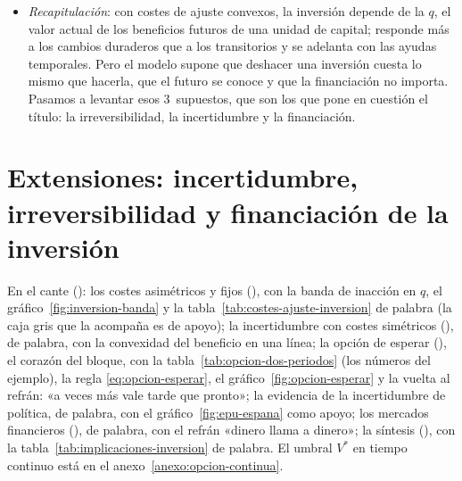 \documentclass[11pt]{article}
\begin{document}
\begin{itemize}
\item \emph{Recapitulación}: con costes de ajuste convexos, la inversión depende de la $q$, el valor actual de los beneficios futuros de una unidad de capital; responde más a los cambios duraderos que a los transitorios y se adelanta con las ayudas temporales. Pero el modelo supone que deshacer una inversión cuesta lo mismo que hacerla, que el futuro se conoce y que la financiación no importa. Pasamos a levantar esos 3~supuestos, que son los que pone en cuestión el título: la irreversibilidad, la incertidumbre y la financiación.
\end{itemize}


\section{Extensiones: incertidumbre, irreversibilidad\cortetitulo{} y financiación de la inversión}\label{sec:extensiones}

\begin{notaopositor}
En el cante (): los costes asimétricos y fijos (), con la banda de inacción en $q$, el gráfico~\ref{fig:inversion-banda} y la tabla~\ref{tab:costes-ajuste-inversion} de palabra (la caja gris que la acompaña es de apoyo); la incertidumbre con costes simétricos (), de palabra, con la convexidad del beneficio en una línea; la opción de esperar (), el corazón del bloque, con la tabla~\ref{tab:opcion-dos-periodos} (los números del ejemplo), la regla \eqref{eq:opcion-esperar}, el gráfico~\ref{fig:opcion-esperar} y la vuelta al refrán: «a veces más vale tarde que pronto»; la evidencia de la incertidumbre de política, de palabra, con el gráfico~\ref{fig:epu-espana} como apoyo; los mercados financieros (), de palabra, con el refrán «dinero llama a dinero»; la síntesis (), con la tabla~\ref{tab:implicaciones-inversion} de palabra. El umbral $V^*$ en tiempo continuo está en el anexo~\ref{anexo:opcion-continua}.
\end{notaopositor}
\end{document}
